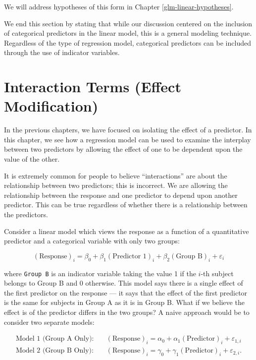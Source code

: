 \documentclass[
]{book}
\theoremstyle{plain}
\theoremstyle{mydefn}
\theoremstyle{myexmpl}
\theoremstyle{remark}
\begin{document}
We will address hypotheses of this form in Chapter \ref{glm-linear-hypotheses}.

We end this section by stating that while our discussion centered on the inclusion of categorical predictors in the linear model, this is a general modeling technique. Regardless of the type of regression model, categorical predictors can be included through the use of indicator variables.

\hypertarget{glm-interactions}{%
\chapter{Interaction Terms (Effect Modification)}\label{glm-interactions}}

In the previous chapters, we have focused on isolating the effect of a predictor. In this chapter, we see how a regression model can be used to examine the interplay between two predictors by allowing the effect of one to be dependent upon the value of the other.

\begin{rmdwarning}
It is extremely common for people to believe ``interactions'' are about the relationship between two predictors; this is incorrect. We are allowing the relationship between the response and one predictor to depend upon another predictor. This can be true regardless of whether there is a relationship between the predictors.
\end{rmdwarning}

Consider a linear model which views the response as a function of a quantitative predictor and a categorical variable with only two groups:

\[(\text{Response})_i = \beta_0 + \beta_1 (\text{Predictor 1})_i + \beta_2 (\text{Group B})_i + \varepsilon_i\]

where \texttt{Group\ B} is an indicator variable taking the value 1 if the \(i\)-th subject belongs to Group B and 0 otherwise. This model says there is a single effect of the first predictor on the response --- it says that the effect of the first predictor is the same for subjects in Group A as it is in Group B. What if we believe the effect is of the predictor differs in the two groups? A naive approach would be to consider two separate models:

\[
\begin{aligned}
  \text{Model 1 (Group A Only)}:& \quad (\text{Response})_i = 
    \alpha_0 + \alpha_1 (\text{Predictor})_i + \varepsilon_{1,i} \\
  \text{Model 2 (Group B Only)}:& \quad (\text{Response})_i =
    \gamma_0 + \gamma_1 (\text{Predictor})_i + \varepsilon_{2,i}.
\end{aligned}
\]
\end{document}

